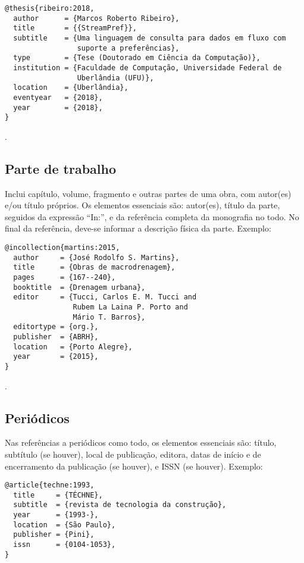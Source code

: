 \begin{verbatim}
@thesis{ribeiro:2018,
  author      = {Marcos Roberto Ribeiro},
  title       = {{StreamPref}},
  subtitle    = {Uma linguagem de consulta para dados em fluxo com
                 suporte a preferências},
  type        = {Tese (Doutorado em Ciência da Computação)},
  institution = {Faculdade de Computação, Universidade Federal de
                 Uberlândia (UFU)},
  location    = {Uberlândia},
  eventyear   = {2018},
  year        = {2018},
}
\end{verbatim}

\noindent
{}.

\subsection{Parte de trabalho}

Inclui capítulo, volume, fragmento e outras partes de uma obra, com autor(es) e/ou título próprios.
Os elementos essenciais são: autor(es), título da parte, seguidos da expressão ``In:'', e da referência completa da monografia no todo. No final da referência, deve-se informar a descrição física da parte.
Exemplo:

\vspace*{1em}

\begin{verbatim}
@incollection{martins:2015,
  author     = {José Rodolfo S. Martins},
  title      = {Obras de macrodrenagem},
  pages      = {167--240},
  booktitle  = {Drenagem urbana},
  editor     = {Tucci, Carlos E. M. Tucci and
                Rubem La Laina P. Porto and
                Mário T. Barros},
  editortype = {org.},
  publisher  = {ABRH},
  location   = {Porto Alegre},
  year       = {2015},
}
\end{verbatim}

\noindent
{}.

\subsection{Periódicos}

Nas referências a periódicos como todo, os elementos essenciais são: título, subtítulo (se houver), local de publicação, editora, datas de início e de encerramento da publicação (se houver), e ISSN (se houver).
Exemplo:

\vspace*{1em}

\begin{verbatim}
@article{techne:1993,
  title     = {TÉCHNE},
  subtitle  = {revista de tecnologia da construção},
  year      = {1993-},
  location  = {São Paulo},
  publisher = {Pini},
  issn      = {0104-1053},
}
\end{verbatim}

